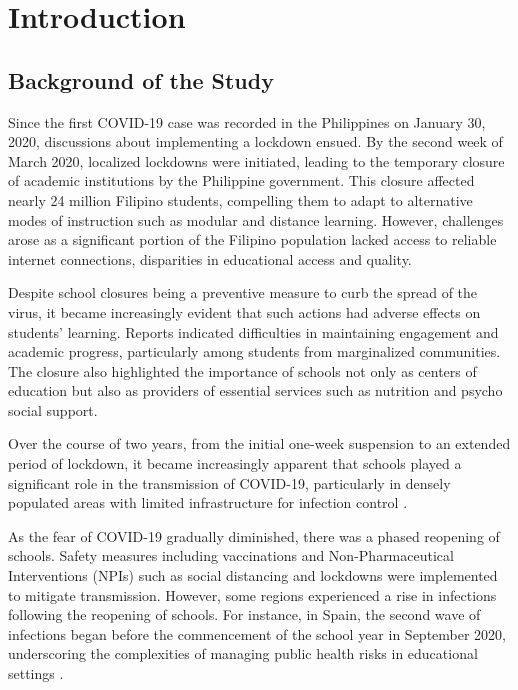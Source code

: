 \chapter{Introduction}
\label{chap:intro}


\section{Background of the Study}

Since the first COVID-19 case was recorded in the Philippines on January 30, 2020, discussions about implementing a lockdown ensued. By the second week of March 2020, localized lockdowns were initiated, leading to the temporary closure of academic institutions by the Philippine government\cite{worldhealthorganization_2023_who}. This closure affected nearly 24 million Filipino students, compelling them to adapt to alternative modes of instruction such as modular and distance learning. However, challenges arose as a significant portion of the Filipino population lacked access to reliable internet connections, disparities in educational access and quality.

Despite school closures being a preventive measure to curb the spread of the virus, it became increasingly evident that such actions had adverse effects on students' learning. Reports indicated difficulties in maintaining engagement and academic progress, particularly among students from marginalized communities. The closure also highlighted the importance of schools not only as centers of education but also as providers of essential services such as nutrition and psycho social support.

Over the course of two years, from the initial one-week suspension to an extended period of lockdown, it became increasingly apparent that schools played a significant role in the transmission of COVID-19, particularly in densely populated areas with limited infrastructure for infection control \cite{jones_2017_school}.

As the fear of COVID-19 gradually diminished, there was a phased reopening of schools. Safety measures including vaccinations and Non-Pharmaceutical Interventions (NPIs) such as social distancing and lockdowns were implemented to mitigate transmission. However, some regions experienced a rise in infections following the reopening of schools. For instance, in Spain, the second wave of infections began before the commencement of the school year in September 2020, underscoring the complexities of managing public health risks in educational settings \cite{soriano_2021_main}.

